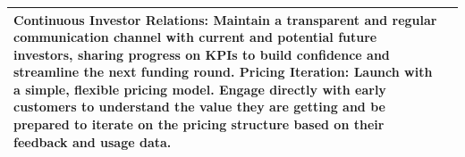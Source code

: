\documentclass[11pt, a4paper, oneside]{article}
\begin{document}
\begin{table}[H]
\begin{tabularx}{\textwidth}{@{}lL@{}}
\textbf{Continuous Investor Relations:} Maintain a transparent and regular communication channel with current and potential future investors, sharing progress on KPIs to build confidence and streamline the next funding round. \newline\newline
\textbf{Pricing Iteration:} Launch with a simple, flexible pricing model. Engage directly with early customers to understand the value they are getting and be prepared to iterate on the pricing structure based on their feedback and usage data. \\
\bottomrule
\end{tabularx}
\end{table}

\end{document}
